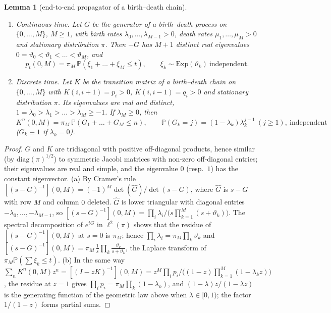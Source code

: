 \documentclass[11pt,a4paper]{article}
\newtheorem{lemma}[theorem]{Lemma}
\theoremstyle{definition}
\newcommand{\Prob}{\mathbb P}
\begin{document}
\begin{lemma}[end-to-end propagator of a birth--death chain]\label{lem:bd}
\begin{enumerate}
\item[(a)] \emph{Continuous time.} Let $G$ be the generator of a birth--death process on $\{0,\dots,M\}$, $M\ge1$, with birth rates $\lambda_0,\dots,\lambda_{M-1}>0$, death rates $\mu_1,\dots,\mu_M>0$ and stationary distribution $\pi$. Then $-G$ has $M+1$ distinct real eigenvalues $0=\vartheta_0<\vartheta_1<\dots<\vartheta_M$, and
\[
p_t(0,M)=\pi_M\,\Prob(\xi_1+\dots+\xi_M\le t),\qquad \xi_k\sim\mathrm{Exp}(\vartheta_k)\ \text{independent}.
\]
\item[(b)] \emph{Discrete time.} Let $K$ be the transition matrix of a birth--death chain on $\{0,\dots,M\}$ with $K(i,i+1)=p_i>0$, $K(i,i-1)=q_i>0$ and stationary distribution $\pi$. Its eigenvalues are real and distinct, $1=\lambda_0>\lambda_1>\dots>\lambda_M\ge-1$. If $\lambda_M\ge0$, then
\[
K^n(0,M)=\pi_M\,\Prob(G_1+\dots+G_M\le n),\qquad \Prob(G_k=j)=(1-\lambda_k)\lambda_k^{j-1}\ (j\ge1),\ \text{independent}
\]
($G_k\equiv1$ if $\lambda_k=0$).
\end{enumerate}
\end{lemma}
\begin{proof}
$G$ and $K$ are tridiagonal with positive off-diagonal products, hence similar (by $\mathrm{diag}(\pi)^{1/2}$) to symmetric Jacobi matrices with non-zero off-diagonal entries; their eigenvalues are real and simple, and the eigenvalue $0$ (resp.\ $1$) has the constant eigenvector. (a) By Cramer's rule $[(s-G)^{-1}](0,M)=(-1)^M\det(\hat G)/\det(s-G)$, where $\hat G$ is $s-G$ with row $M$ and column $0$ deleted. $\hat G$ is lower triangular with diagonal entries $-\lambda_0,\dots,-\lambda_{M-1}$, so $[(s-G)^{-1}](0,M)=\prod_i\lambda_i\big/\bigl(s\prod_{k=1}^M(s+\vartheta_k)\bigr)$. The spectral decomposition of $e^{tG}$ in $\ell^2(\pi)$ shows that the residue of $[(s-G)^{-1}](0,M)$ at $s=0$ is $\pi_M$; hence $\prod_i\lambda_i=\pi_M\prod_k\vartheta_k$ and $[(s-G)^{-1}](0,M)=\pi_M\,\frac1s\prod_k\frac{\vartheta_k}{s+\vartheta_k}$, the Laplace transform of $\pi_M\Prob(\sum\xi_k\le t)$. (b) In the same way $\sum_nK^n(0,M)z^n=[(I-zK)^{-1}](0,M)=z^M\prod_ip_i\big/\bigl((1-z)\prod_{k=1}^M(1-\lambda_kz)\bigr)$, the residue at $z=1$ gives $\prod_ip_i=\pi_M\prod_k(1-\lambda_k)$, and $(1-\lambda)z/(1-\lambda z)$ is the generating function of the geometric law above when $\lambda\in[0,1)$; the factor $1/(1-z)$ forms partial sums.
\end{proof}
\end{document}
